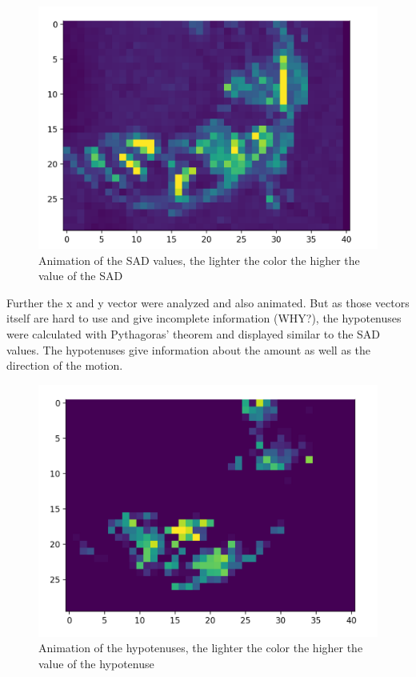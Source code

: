 \documentclass[12pt, a4paper]{report}
\begin{document}
    \bigskip
    \noindent
    \begin{figure}
    \centering
    \includegraphics[scale=0.4]{Images/animation_sad.png}
    
    \caption{Animation of the SAD values, the lighter the color the higher the value of the SAD}
    \end{figure}
    
    \bigskip
     
    Further the x and y vector were analyzed and also animated. But as those vectors itself are hard to use and give incomplete information (WHY?), the hypotenuses were calculated with Pythagoras' theorem and displayed similar to the SAD values. The hypotenuses give information about the amount as well as the direction of the motion.
    
    \bigskip
    \noindent
    \begin{figure}
    \centering
    \includegraphics[scale=0.4]{Images/animation_hypotenuse.png}
    
    \caption{Animation of the hypotenuses, the lighter the color the higher the value of the hypotenuse}
    \end{figure}
    
\end{document}
